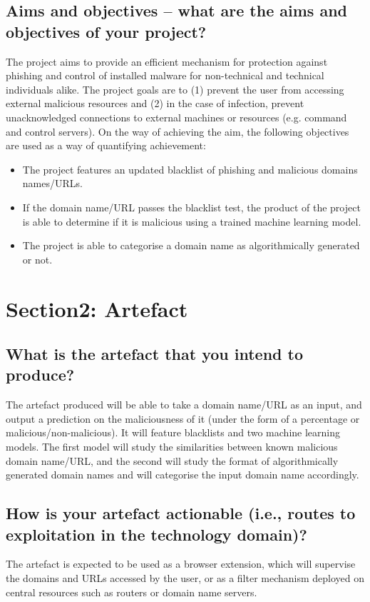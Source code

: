 \begin{mdframed}
	\tocless\subsection{Aims and objectives – what are the aims and objectives of your project?}
	The project aims to provide an efficient mechanism for protection against phishing and control of installed malware for non-technical and technical individuals alike. The project goals are to (1) prevent the user from accessing external malicious resources and (2) in the case of infection, prevent unacknowledged connections to external machines or resources (e.g. command and control servers).
	On the way of achieving the aim, the following objectives are used as a way of quantifying achievement:
	\begin{itemize}
		\item The project features an updated blacklist of phishing and malicious domains names/URLs.
		\item If the domain name/URL passes the blacklist test, the product of the project is able to determine if it is malicious using a trained machine learning model.
		\item The project is able to categorise a domain name as algorithmically generated or not.\newline
	\end{itemize}
\end{mdframed}


\tocless\section{Section2: Artefact}
\begin{mdframed}
	\tocless\subsection{What is the artefact that you intend to produce?}
	The artefact produced will be able to take a domain name/URL as an input, and output a prediction on the maliciousness of it (under the form of a percentage or malicious/non-malicious). It will feature blacklists and two machine learning models. The first model will study the similarities between known malicious domain name/URL, and the second will study the format of algorithmically generated domain names and will categorise the input domain name accordingly.\end{mdframed}

\begin{mdframed}
	\tocless\subsection{How is your artefact actionable (i.e., routes to exploitation in the technology domain)?}
	The artefact is expected to be used as a browser extension, which will supervise the domains and URLs accessed by the user, or as a filter mechanism deployed on central resources such as routers or domain name servers.
\end{mdframed}

